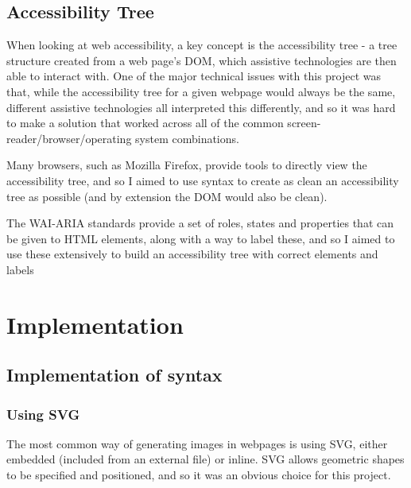 \documentclass[ %
                    author={Aleena Baig},
                supervisor={Dr Simon Lock},
                    degree={BSc},
                     title={On Making Web Accessible Graphs},
                  subtitle={},
                      year={2019} ]{dissertation}
\begin{document}
\section{Accessibility Tree}

When looking at web accessibility, a key concept is the accessibility tree - a tree structure created from a web page's DOM, which assistive technologies are then able to interact with. One of the major technical issues with this project was that, while the accessibility tree for a given webpage would always be the same, different assistive technologies all interpreted this differently, and so it was hard to make a solution that worked across all of the common screen-reader/browser/operating system combinations.


Many browsers, such as Mozilla Firefox, provide tools to directly view the accessibility tree, and so I aimed to use syntax to create as clean an accessibility tree as possible (and by extension the DOM would also be clean).

The WAI-ARIA standards provide a set of roles, states and properties that can be given to HTML elements, along with a way to label these, and so I aimed to use these extensively to build an accessibility tree with correct elements and labels


\chapter{Implementation}

\section{Implementation of syntax}

\subsection{Using SVG}

The most common way of generating images in webpages is using SVG, either embedded (included from an external file) or inline. SVG allows geometric shapes to be specified and positioned, and so it was an obvious choice for this project.
\end{document}
